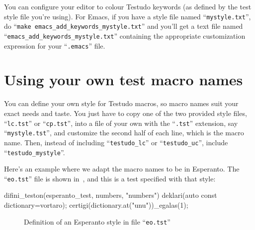 \documentclass[twoside, a4paper, article]{memoir}
\begin{document}
You can configure your editor to colour Testudo keywords (as defined by the
test style file you're using).  For Emacs, if you have a style file named
``\texttt{mystyle.txt}'', do ``\texttt{make
  emacs\_add\_keywords\_mystyle.txt}'' and you'll get a text file named
``\texttt{emacs\_add\_keywords\_mystyle.txt}'' containing the appropriate
customization expression for your ``\texttt{.emacs}'' file.


\chapter{Using your own test macro names}
\label{cha:using-your-own-test-macro-names}

You can define your own style for Testudo macros, so macro names suit your
exact needs and taste.  You just have to copy one of the two provided style
files, ``\texttt{lc.tst}'' or ``\texttt{cp.tst}'', into a file of your own with
the ``\texttt{.tst}'' extension, say ``\texttt{mystyle.tst}'', and customize
the second half of each line, which is the macro name.  Then, instead of
including ``\texttt{testudo\_lc}'' or ``\texttt{testudo\_uc}'', include
``\texttt{testudo\_mystyle}''.

Here's an example where we adapt the macro names to be in Esperanto.  The
``\texttt{eo.tst}'' file is shown in~, and this is a
test specified with that style:
\begin{cpplisting}
difini_teston(esperanto_test, numbers, "numbers") {
  deklari(auto const dictionary=vortaro);
  certigi(dictionary.at("unu"))_egalas(1);
}
\end{cpplisting}

\begin{figure}
  \centering
  \caption{Definition of an Esperanto style in file ``\texttt{eo.tst}''}
  \label{fig:esperanto-style}
\end{figure}

\backmatter
\end{document}

